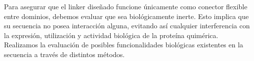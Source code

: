 Para asegurar que el linker diseñado funcione únicamente como conector flexible entre dominios, debemos evaluar que sea biológicamente inerte.
Esto implica que su secuencia no posea interacción alguna, evitando así cualquier interferencia con la expresión, utilización y actividad biológica de la proteína quimérica.
Realizamos la evaluación de posibles funcionalidades biológicas existentes en la secuencia a través de distintos métodos.








